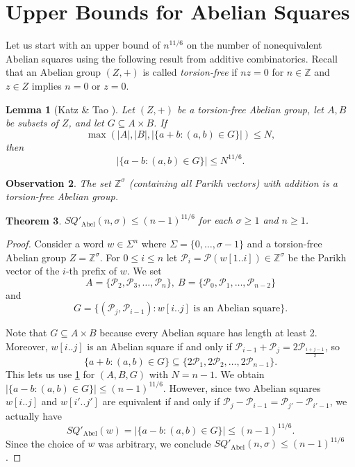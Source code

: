 \documentclass{article}
\theoremstyle{plain}
\newtheorem{theorem}{Theorem}[section]
\newtheorem{lemma}[theorem]{Lemma}
\newtheorem{observation}[theorem]{Observation}
\theoremstyle{definition}
\theoremstyle{remark}
\renewcommand{\P}{\mathcal{P}}
\newcommand{\SQ}{\mathit{SQ}}
\newcommand{\SQPABEL}{\SQ'_{\mathrm{Abel}}}
\begin{document}
  \section{Upper Bounds for Abelian Squares}\label{sec:upper}
  Let us start with an upper bound of $n^{11/6}$ on the number
  of nonequivalent Abelian squares using the following result from additive combinatorics.
  Recall that an Abelian group $(Z,+)$ is called \emph{torsion-free} if $nz=0$ for $n\in \mathbb{Z}$ and $z\in Z$ implies $n=0$ or $z=0$.
  \begin{lemma}[Katz \& Tao \cite{katz1999bounds}]\label{lem:tao}
  Let $(Z,+)$ be a torsion-free Abelian group, let $A,B$ be subsets of $Z$, and let $G \subseteq A\times B$.
  If \[\max(|A|,|B|,|\{a+b : (a,b)\in G\}|)\le N,\] then
  \[|\{a-b : (a,b)\in G\}| \le N^{11/6}.\]
  \end{lemma}

  \begin{observation}
    The set $\mathbb{Z}^{\sigma}$ (containing all Parikh vectors) with addition is
    a torsion-free Abelian group.
  \end{observation}
  
  \begin{theorem}
  $\SQPABEL(n,\sigma)\le (n-1)^{11/6}$ for each $\sigma\ge 1$ and $n\ge 1$.
  \end{theorem}
  \begin{proof}
  Consider a word $w \in \Sigma^n$ where $\Sigma=\{0,\ldots,\sigma-1\}$ and a torsion-free Abelian group $Z=\mathbb{Z}^\sigma$.
  For $0\le i \le n$ let $\P_i = \P(w[1..i])\in \mathbb{Z}^\sigma$ be the Parikh
  vector of the $i$-th prefix of $w$. We set 
  \[A=\{\P_2,\P_3,\ldots,\P_n\},\ B=\{\P_0,\P_1,\ldots,\P_{n-2}\}\]
  and
  \[G=\{(\P_{j},\P_{i-1}) : w[i..j]\text{ is an Abelian square}\}.\]
  
  Note that $G\subseteq A\times B$ because every Abelian square has length at least 2.
  Moreover, $w[i..j]$ is an Abelian square if and only if $\P_{i-1}+\P_{j}=2\P_{\frac{i+j-1}{2}}$,
  so \[ \{a+b : (a,b)\in G\} \subseteq \{2\P_1,2\P_2,\ldots,2\P_{n-1}\}.\]
  This lets us use \cref{lem:tao} for $(A,B,G)$ with $N=n-1$.
  We obtain $|\{a-b : (a,b)\in G\}|\le (n-1)^{11/6}$. However,
  since two Abelian squares $w[i..j]$ and $w[i'..j']$ are equivalent if and only if $\P_{j}-\P_{i-1}=\P_{j'}-\P_{i'-1}$,
  we actually have \[\SQPABEL(w)=|\{a-b : (a,b)\in G\}| \le (n-1)^{11/6}.\]
  Since the choice of $w$ was arbitrary, we conclude $\SQPABEL(n,\sigma)\le (n-1)^{11/6}$.
  \end{proof}
  
\end{document}
